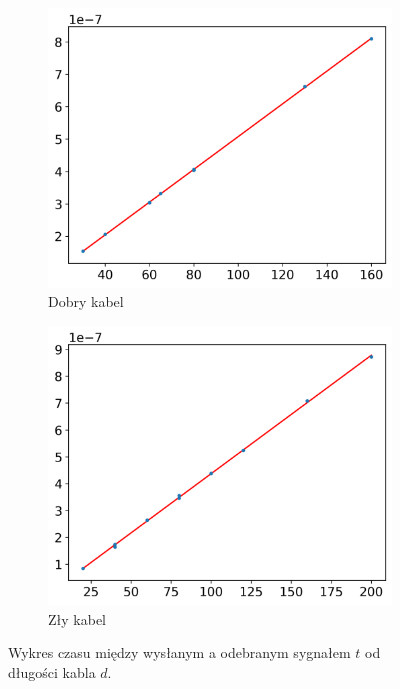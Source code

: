 \documentclass[12pt]{article}
\begin{document}
\begin{figure}[H]
  \centering
  \begin{subfigure}{0.45\textwidth}
    \includegraphics[width=\linewidth]{good_cable_distance}
    \caption{Dobry kabel}
    \label{fig:good_distance}
  \end{subfigure}\hfill
  \begin{subfigure}{0.45\textwidth}
    \includegraphics[width=\linewidth]{bad_cable_distance}
    \caption{Zły kabel}
    \label{fig:bad_distance}
  \end{subfigure}
  \caption{Wykres czasu między wysłanym a odebranym sygnałem \(t\) od długości kabla \(d\).}
  \label{fig:distance}
\end{figure}
\end{document}
